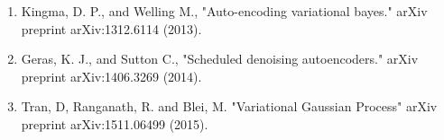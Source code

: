 \documentclass[landscape,a0b,final,a4resizeable]{include/a0poster}
\begin{document}
\begin{poster}
\begin{multicols}{3}
\begin{enumerate}
\item Kingma, D. P., and  Welling M., "Auto-encoding variational bayes." arXiv preprint arXiv:1312.6114 (2013).
\item Geras, K. J., and Sutton C., "Scheduled denoising autoencoders." arXiv preprint arXiv:1406.3269 (2014).
\item Tran, D, Ranganath, R. and Blei, M. "Variational Gaussian Process" arXiv preprint arXiv:1511.06499 (2015).
\end{enumerate}

\end{multicols}
\end{poster}
\end{document}
